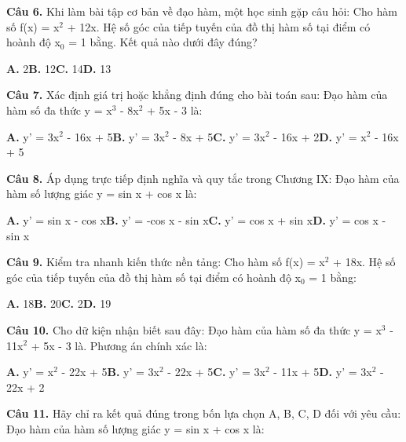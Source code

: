 \documentclass[11pt,a4paper]{article}
\begin{document}
\textbf{\color{primary} Câu 6.} Khi làm bài tập cơ bản về đạo hàm, một học sinh gặp câu hỏi: Cho hàm số f(x) = x$^2$ + 12x. Hệ số góc của tiếp tuyến của đồ thị hàm số tại điểm có hoành độ x$_0$ = 1 bằng. Kết quả nào dưới đây đúng?\par
\hspace*{1.5em}\textbf{A.} 2\quad\quad \textbf{B.} 12\quad\quad \textbf{C.} 14\quad\quad \textbf{D.} 13\par\vspace{2pt}
\textbf{\color{primary} Câu 7.} Xác định giá trị hoặc khẳng định đúng cho bài toán sau: Đạo hàm của hàm số đa thức y = x$^3$ - 8x$^2$ + 5x - 3 là:\par
\hspace*{1.5em}\textbf{A.} y' = 3x$^2$ - 16x + 5\quad\quad \textbf{B.} y' = 3x$^2$ - 8x + 5\quad\quad \textbf{C.} y' = 3x$^2$ - 16x + 2\quad\quad \textbf{D.} y' = x$^2$ - 16x + 5\par\vspace{2pt}
\textbf{\color{primary} Câu 8.} Áp dụng trực tiếp định nghĩa và quy tắc trong Chương IX: Đạo hàm của hàm số lượng giác y = sin x + cos x là:\par
\hspace*{1.5em}\textbf{A.} y' = sin x - cos x\quad\quad \textbf{B.} y' = -cos x - sin x\quad\quad \textbf{C.} y' = cos x + sin x\quad\quad \textbf{D.} y' = cos x - sin x\par\vspace{2pt}
\textbf{\color{primary} Câu 9.} Kiểm tra nhanh kiến thức nền tảng: Cho hàm số f(x) = x$^2$ + 18x. Hệ số góc của tiếp tuyến của đồ thị hàm số tại điểm có hoành độ x$_0$ = 1 bằng:\par
\hspace*{1.5em}\textbf{A.} 18\quad\quad \textbf{B.} 20\quad\quad \textbf{C.} 2\quad\quad \textbf{D.} 19\par\vspace{2pt}
\textbf{\color{primary} Câu 10.} Cho dữ kiện nhận biết sau đây: Đạo hàm của hàm số đa thức y = x$^3$ - 11x$^2$ + 5x - 3 là. Phương án chính xác là:\par
\hspace*{1.5em}\textbf{A.} y' = x$^2$ - 22x + 5\quad\quad \textbf{B.} y' = 3x$^2$ - 22x + 5\quad\quad \textbf{C.} y' = 3x$^2$ - 11x + 5\quad\quad \textbf{D.} y' = 3x$^2$ - 22x + 2\par\vspace{2pt}
\textbf{\color{primary} Câu 11.} Hãy chỉ ra kết quả đúng trong bốn lựa chọn A, B, C, D đối với yêu cầu: Đạo hàm của hàm số lượng giác y = sin x + cos x là:\par
\end{document}

